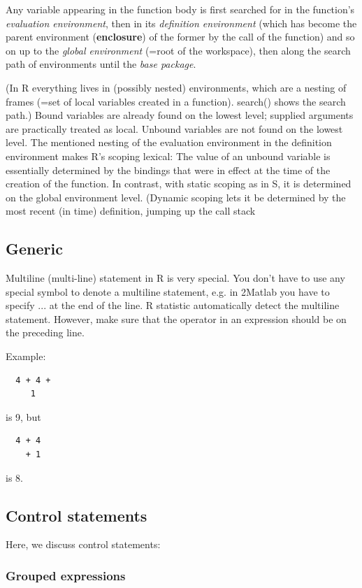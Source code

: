 Any variable appearing in the function body is first searched for in
the function's {\it evaluation environment}, then in its
{\it definition environment} (which has become the parent environment
({\bf enclosure}) of the former by the call of the function) and so on
up to the {\it global environment} (=root of the workspace), then
along the search path of environments until the {\it base
  package}.

(In R everything lives in (possibly nested) environments, which are a
nesting of frames (=set of local variables created in a
function). search() shows the search path.) Bound variables are
already found on the lowest level; supplied arguments are practically
treated as local. Unbound variables are not found on the lowest
level. The mentioned nesting of the evaluation environment in the
definition environment makes R's scoping lexical: The value of an
unbound variable is essentially determined by the bindings that were
in effect at the time of the creation of the function. In contrast,
with static scoping as in S, it is determined on the global
environment level. (Dynamic scoping lets it be determined by the most
recent (in time) definition, jumping up the call stack


\subsection{Generic}
\label{sec:generic}

Multiline (multi-line) statement in R is very special. You don't have
to use any special symbol to denote a multiline statement, e.g. in
2Matlab you have to specify ... at the end of the line. R statistic
automatically detect the multiline statement. However, make sure that
the operator in an expression should be on the preceding line.

Example:
\begin{lstlisting}
  4 + 4 + 
     1
\end{lstlisting}
is 9, but
\begin{lstlisting}
  4 + 4 
    + 1
\end{lstlisting}
is 8.


\subsection{Control statements}
\label{sec:control-statements}

Here, we discuss control statements:

\subsubsection{Grouped expressions}
\label{sec:grouped-expressions}

